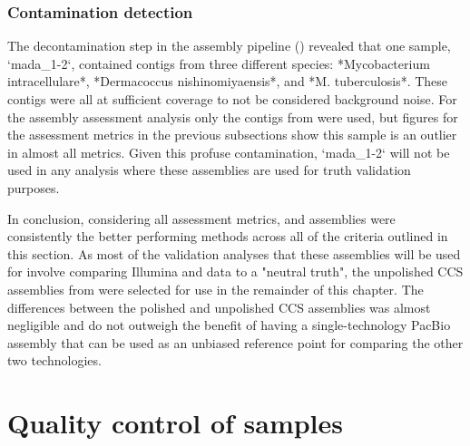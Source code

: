 \subsubsection{Contamination detection}

The decontamination step in the assembly pipeline () revealed that one sample, `mada\_1-2`, contained contigs from three different species: *Mycobacterium intracellulare*, *Dermacoccus nishinomiyaensis*, and *M. tuberculosis*. These contigs were all at sufficient coverage to not be considered background noise. For the assembly assessment analysis only the contigs from \mtb{} were used, but figures for the assessment metrics in the previous subsections show this sample is an outlier in almost all metrics. Given this profuse contamination, `mada\_1-2` will not be used in any analysis where these assemblies are used for truth validation purposes.


In conclusion, considering all assessment metrics,  and  assemblies were consistently the better performing methods across all of the criteria outlined in this section. As most of the validation analyses that these assemblies will be used for involve comparing Illumina and \ont{} data to a "neutral truth", the unpolished CCS assemblies from  were selected for use in the remainder of this chapter. The differences between the polished and unpolished CCS assemblies was almost negligible and do not outweigh the benefit of having a single-technology PacBio assembly that can be used as an unbiased reference point for comparing the other two technologies.


\section{Quality control of samples}
\label{sec:ch2-qc}

